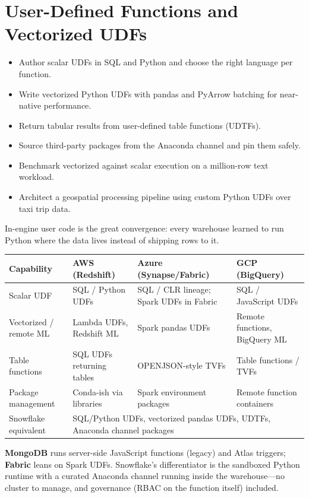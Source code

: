 \chapter{User-Defined Functions and Vectorized UDFs}
%
\begin{objectives}
\begin{itemize}
    \item Author scalar UDFs in SQL and Python and choose the right language per function.
    \item Write vectorized Python UDFs with pandas and PyArrow batching for near-native performance.
    \item Return tabular results from user-defined table functions (UDTFs).
    \item Source third-party packages from the Anaconda channel and pin them safely.
    \item Benchmark vectorized against scalar execution on a million-row text workload.
    \item Architect a geospatial processing pipeline using custom Python UDFs over taxi trip data.
\end{itemize}
\end{objectives}

\begin{crosscloud}
In-engine user code is the great convergence: every warehouse learned to run Python where the data lives instead of shipping rows to it.

\vspace{2mm}
{\footnotesize
\begin{tabular}{@{}p{2.8cm}p{3.0cm}p{3.0cm}p{3.0cm}@{}}
\toprule
\textbf{Capability} & \textbf{AWS (Redshift)} & \textbf{Azure (Synapse/Fabric)} & \textbf{GCP (BigQuery)} \\
\midrule
Scalar UDF & SQL / Python UDFs & SQL / CLR lineage; Spark UDFs in Fabric & SQL / JavaScript UDFs \\
Vectorized / remote ML & Lambda UDFs, Redshift ML & Spark pandas UDFs & Remote functions, BigQuery ML \\
Table functions & SQL UDFs returning tables & OPENJSON-style TVFs & Table functions / TVFs \\
Package management & Conda-ish via libraries & Spark environment packages & Remote function containers \\
\addlinespace
Snowflake equivalent & \multicolumn{3}{l}{SQL/Python UDFs, vectorized pandas UDFs, UDTFs, Anaconda channel packages} \\
\bottomrule
\end{tabular}}

\vspace{1mm}
\textbf{MongoDB} runs server-side JavaScript functions (legacy) and Atlas triggers; \textbf{Fabric} leans on Spark UDFs. Snowflake's differentiator is the sandboxed Python runtime with a curated Anaconda channel running inside the warehouse---no cluster to manage, and governance (RBAC on the function itself) included.
\end{crosscloud}

